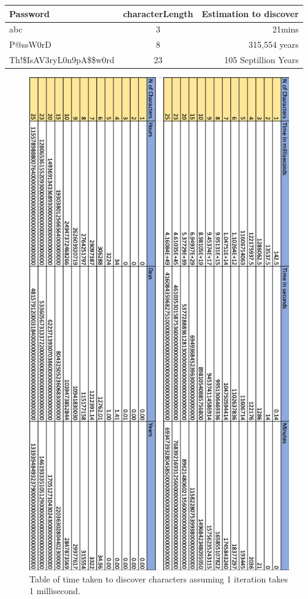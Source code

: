 \documentclass[a4paper, twoside, 11pt]{article}
\begin{document}
  \begin{center}
	\begin{tabular}{ |l|c|r| } 
	 \hline
	 Password & characterLength & Estimation to discover \\
	 \hline
	 abc & 3 & 21mins \\
	 P@ssW0rD & 8 & 315,554 years \\
	 Th!\$IsAV3ryL0n9pA\$\$w0rd & 23 & 105 Septillion Years \\
	 \hline
	\end{tabular}
\end{center}

  \newpage

\begin{figure}[H]
	\centering
	\includegraphics[scale=0.9]{Images/timeEstimationImage.png}
	\caption{Table of time taken to discover characters assuming 1 iteration takes 1 millisecond.}
\end{figure}
\end{document}
